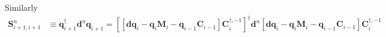 Similarly
\begin{align}
    \bm{S}_{i+1,i+1}^{n}&\equiv\bm{q}_{i+1}^{\dag}\bm{d}^n\bm{q}_{i+1} = \left[\left[\mathbf{d} \mathbf{q}_i-\mathbf{q}_i \mathbf{M}_i-\mathbf{q}_{i-1} \mathbf{C}_{i-1}\right]\bm{C}_i^{\dag, -1}\right]^{\dag}\bm{d}^n\left[\mathbf{d} \mathbf{q}_i-\mathbf{q}_i \mathbf{M}_i-\mathbf{q}_{i-1} \mathbf{C}_{i-1}\right]\bm{C}_i^{\dag, -1}\\
\end{align}
